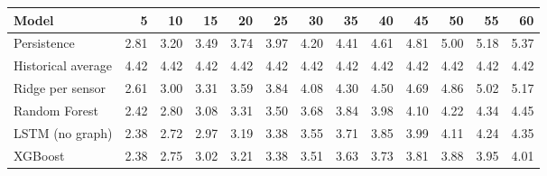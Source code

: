 \begin{tabular}{@{}lrrrrrrrrrrrr@{}}
\toprule
Model & 5 & 10 & 15 & 20 & 25 & 30 & 35 & 40 & 45 & 50 & 55 & 60 \\
\midrule
Persistence & 2.81 & 3.20 & 3.49 & 3.74 & 3.97 & 4.20 & 4.41 & 4.61 & 4.81 & 5.00 & 5.18 & 5.37 \\
Historical average & 4.42 & 4.42 & 4.42 & 4.42 & 4.42 & 4.42 & 4.42 & 4.42 & 4.42 & 4.42 & 4.42 & 4.42 \\
Ridge per sensor & 2.61 & 3.00 & 3.31 & 3.59 & 3.84 & 4.08 & 4.30 & 4.50 & 4.69 & 4.86 & 5.02 & 5.17 \\
Random Forest & 2.42 & 2.80 & 3.08 & 3.31 & 3.50 & 3.68 & 3.84 & 3.98 & 4.10 & 4.22 & 4.34 & 4.45 \\
LSTM (no graph) & 2.38 & 2.72 & 2.97 & 3.19 & 3.38 & 3.55 & 3.71 & 3.85 & 3.99 & 4.11 & 4.24 & 4.35 \\
XGBoost & 2.38 & 2.75 & 3.02 & 3.21 & 3.38 & 3.51 & 3.63 & 3.73 & 3.81 & 3.88 & 3.95 & 4.01 \\
\bottomrule
\end{tabular}
